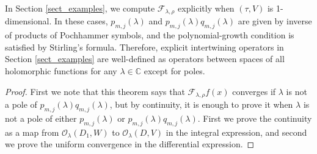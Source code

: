 \documentclass[pdftex]{sigma}
\numberwithin{equation}{section}
\newcommand{\BC}{\mathbb{C}}
\newcommand{\cF}{\mathcal{F}}
\newcommand{\cO}{\mathcal{O}}
\begin{document}
In Section \ref{sect_examples}, we compute $\cF_{\lambda,\rho}$ explicitly when $(\tau,V)$ is 1-dimensional.
In these cases, $p_{m,j}(\lambda)$ and $p_{m,j}(\lambda)q_{m,j}(\lambda)$ are given by inverse of products of Pochhammer symbols,
and the polynomial-growth condition is satisfied by Stirling's formula.
Therefore, explicit intertwining operators in Section \ref{sect_examples} are well-defined as operators
between spaces of all holomorphic functions for any $\lambda\in\BC$ except for poles.
\begin{proof}
First we note that this theorem says that $\cF_{\lambda,\rho}f(x)$ converges if $\lambda$ is not a pole of $p_{m,j}(\lambda)q_{m,j}(\lambda)$,
but by continuity, it is enough to prove it when $\lambda$ is not a pole of either $p_{m,j}(\lambda)$ or $p_{m,j}(\lambda)q_{m,j}(\lambda)$.
First we prove the continuity as a map from $\cO_\lambda(D_1,W)$ to $\cO_\lambda(D,V)$ in the integral expression,
and second we prove the uniform convergence in the differential expression.


\end{proof}
\end{document}
